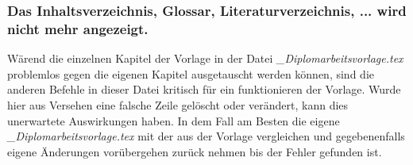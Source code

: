 \subsubsection*{Das Inhaltsverzeichnis, Glossar, Literaturverzeichnis, ... wird nicht mehr angezeigt.}
Wärend die einzelnen Kapitel der Vorlage in der Datei \textit{\_Diplomarbeitsvorlage.tex} problemlos gegen die eigenen Kapitel ausgetauscht werden können, sind die anderen Befehle in dieser Datei kritisch für ein funktionieren der Vorlage. Wurde hier aus Versehen eine falsche Zeile gelöscht oder verändert, kann dies unerwartete Auswirkungen haben. In dem Fall am Besten die eigene \textit{\_Diplomarbeitsvorlage.tex} mit der aus der Vorlage vergleichen und gegebenenfalls eigene Änderungen vorübergehen zurück nehmen bis der Fehler gefunden ist.